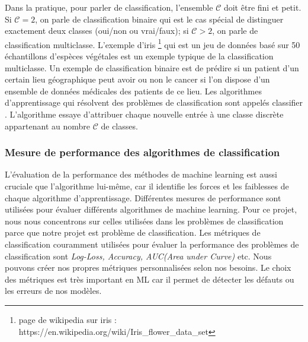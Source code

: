 \documentclass[12pt, french]{report}
\begin{document}
Dans la pratique, pour parler de classification, l'ensemble $\mathcal{C}$ doit être fini et petit. Si $\mathcal{C} = 2$, on parle de classification binaire qui est le cas spécial de distinguer exactement deux classes (oui/non ou vrai/faux); si $\mathcal{C} > 2$, on parle de classification multiclasse. L'exemple d'iris \footnote{page de wikipedia sur iris : https://en.wikipedia.org/wiki/Iris\_flower\_data\_set} qui est un jeu de données basé sur 50 échantillons d'espèces végétales est un exemple typique de la classification multiclasse. Un exemple de classification binaire est de prédire si un patient d'un certain lieu géographique peut avoir ou non le cancer si l'on dispose d'un ensemble de données médicales des patients de ce lieu. Les algorithmes d'apprentissage qui résolvent des problèmes de classification sont appelés  \guillemotleft classifier \guillemotright. L'algorithme essaye d'attribuer chaque nouvelle entrée à une classe discrète appartenant au nombre $\mathcal{C}$ de classes. \cite{key44, key41, key42}


\subsubsection{Mesure de performance des algorithmes de classification}
L'évaluation de la performance des méthodes de machine learning est aussi cruciale que l'algorithme lui-même, car il identifie les forces et les faiblesses de chaque algorithme d'apprentissage. Différentes mesures de performance sont utilisées pour évaluer différents algorithmes de machine learning. Pour ce projet, nous nous concentrons sur celles utilisées dans les problèmes de classification parce que notre projet est problème de classification. Les métriques  de classification couramment utilisées pour évaluer la performance des problèmes de classification sont \textit{Log-Loss, Accuracy, AUC(Area under Curve)} etc. Nous pouvons créer nos propres métriques personnalisées selon nos besoins. Le choix des métriques est très important en ML car il permet de détecter les défauts ou les erreurs de nos modèles. \\
\end{document}

